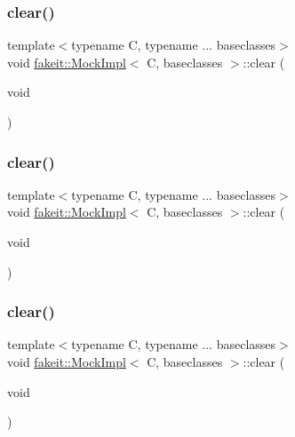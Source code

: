 \subsubsection{\texorpdfstring{clear()}{clear()}\hspace{0.1cm}{\footnotesize\ttfamily [7/9]}}
{\footnotesize\ttfamily template$<$typename C, typename ... baseclasses$>$ \\
void \mbox{\hyperlink{classfakeit_1_1MockImpl}{fakeit\+::\+Mock\+Impl}}$<$ C, baseclasses $>$\+::clear (\begin{DoxyParamCaption}\item[{void}]{ }\end{DoxyParamCaption})\hspace{0.3cm}{\ttfamily [inline]}}

\mbox{\label{classfakeit_1_1MockImpl_a3985505d2ec7bd50a5d71f155c5ae458}} 
\subsubsection{\texorpdfstring{clear()}{clear()}\hspace{0.1cm}{\footnotesize\ttfamily [8/9]}}
{\footnotesize\ttfamily template$<$typename C, typename ... baseclasses$>$ \\
void \mbox{\hyperlink{classfakeit_1_1MockImpl}{fakeit\+::\+Mock\+Impl}}$<$ C, baseclasses $>$\+::clear (\begin{DoxyParamCaption}\item[{void}]{ }\end{DoxyParamCaption})\hspace{0.3cm}{\ttfamily [inline]}}

\mbox{\label{classfakeit_1_1MockImpl_a3985505d2ec7bd50a5d71f155c5ae458}} 
\subsubsection{\texorpdfstring{clear()}{clear()}\hspace{0.1cm}{\footnotesize\ttfamily [9/9]}}
{\footnotesize\ttfamily template$<$typename C, typename ... baseclasses$>$ \\
void \mbox{\hyperlink{classfakeit_1_1MockImpl}{fakeit\+::\+Mock\+Impl}}$<$ C, baseclasses $>$\+::clear (\begin{DoxyParamCaption}\item[{void}]{ }\end{DoxyParamCaption})\hspace{0.3cm}{\ttfamily [inline]}}

